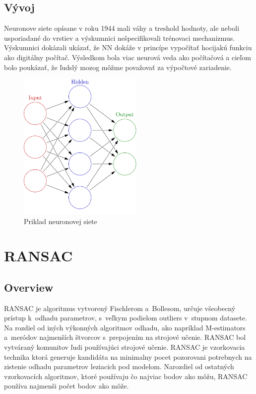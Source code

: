 \subsection{Vývoj}
Neuronove siete opísane v roku 1944 mali váhy a treshold hodnoty, ale neboli usporiadané do vrstiev a výskumnici nešpecifikovali trénovaci mechanizmus. Výskumnici dokázali ukázať, že NN dokáže v princípe vypočítať hocijakú funkciu ako digitálny počítač. Výsledkom bola viac neurová veda ako počítačová a cieľom bolo poukázať, že ľudslý mozog môžme považovať za výpočtové zariadenie.
\begin{figure}[!htbp]
  \centering
  \includegraphics[width=6cm]{img/NN.png}
  \caption{Priklad neuronovej siete}
  \label{vzhladobr}
\end{figure}
\section{RANSAC}
\subsection{Overview}
RANSAC je algoritmus vytvorený Fischlerom a Bollesom, určuje všeobecný prístup k odhadu parametrov, s veľkym podielom outliers v stupnom datasete. Na rozdiel od iných výkonných algoritmov odhadu, ako napríklad M-estimators a meródov najmenších štvorcov s prepojením na strojové učenie. RANSAC bol vytváraný komunitov ľudi používajúci strojové učenie. RANSAC je vzorkovacia technika ktorá generuje kandidáta na minimalny pocet pozorovani potrebnych na zistenie odhadu parametrov leziacich pod modelom. Narozdiel od ostatných vzorkovacích algoritmov, ktoré používaju čo najviac bodov ako môžu, RANSAC používa najmenši počet bodov ako môže.

